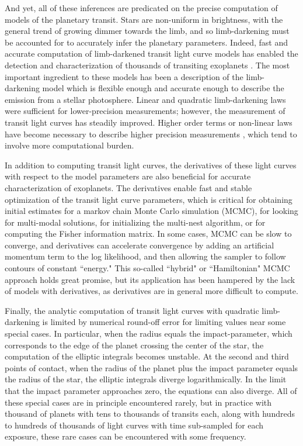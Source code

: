 \documentclass[modern]{aastex61}
\begin{document}
And yet, all of these inferences are predicated on the precise computation of models 
of the planetary transit.  Stars are non-uniform in brightness, with the general
trend of growing dimmer towards the limb, and so limb-darkening must be accounted
for to accurately infer the planetary parameters.  Indeed, fast and accurate computation 
of limb-darkened transit light curve models has enabled the detection and 
characterization of thousands of transiting exoplanets \citep{MandelAgol2002}.
The most important ingredient to these models has been a description of the
limb-darkening model which is flexible enough and accurate enough to describe the 
emission from a stellar photosphere.  Linear and quadratic limb-darkening laws
were sufficient for lower-precision measurements; however, the measurement of
transit light curves has steadily improved.  Higher order terms or non-linear laws 
have become necessary to describe higher precision measurements \citep{Claret2000,
Gimenez2006}, which tend to involve more computational burden.

In addition to computing transit light curves, the derivatives of these light
curves with respect to the model parameters are also beneficial for accurate
characterization of exoplanets.   The derivatives enable fast and stable
optimization of the transit light curve parameters, which is critical for
obtaining initial estimates for a markov chain Monte Carlo simulation (MCMC),
for looking for multi-modal solutions, for initializing the multi-nest
algorithm, or for computing the Fisher information matrix.
In some cases, MCMC can be slow to converge, and derivatives can accelerate
convergence by adding an artificial momentum term to the log likelihood,
and then allowing the sampler to follow contours of constant ``energy."
This so-called ``hybrid" or ``Hamiltonian" MCMC approach holds great promise,
but its application has been hampered by the lack of models with derivatives,
as derivatives are in general more difficult to compute.

Finally, the analytic computation of transit light curves with quadratic
limb-darkening is limited by numerical round-off error for limiting
values near some special cases.  In 
particular, when the radius equals the impact-parameter, which corresponds to 
the edge of the planet crossing the center of the star, the computation of the 
elliptic integrals becomes unstable.  At the second and third points of
contact, when the radius of the planet plus the impact parameter equals
the radius of the star, the elliptic integrals diverge logarithmically.  In the
limit that the impact parameter approaches zero, the equations can also
diverge.  All of these special cases are in principle encountered rarely,
but in practice with thousand of planets with tens to thousands of
transits each, along with hundreds to hundreds of thousands of light
curves with time sub-sampled for each exposure, these rare cases can
be encountered with some frequency.
\end{document}
